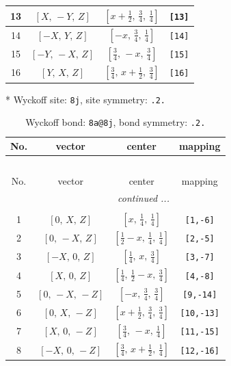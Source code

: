 \documentclass[fleqn,8pt]{jsarticle}
\begin{document}
\begin{longtable}{cccc}
13 & $\left[ X,\, - Y,\, Z \right]$ & $\left[ x + \frac{1}{2},\, \frac{3}{4},\, \frac{1}{4} \right]$ & {\tt [13]} \\ \hline
14 & $\left[ - X,\, Y,\, Z \right]$ & $\left[ - x,\, \frac{3}{4},\, \frac{1}{4} \right]$ & {\tt [14]} \\ \hline
15 & $\left[ - Y,\, - X,\, Z \right]$ & $\left[ \frac{3}{4},\, - x,\, \frac{3}{4} \right]$ & {\tt [15]} \\ \hline
16 & $\left[ Y,\, X,\, Z \right]$ & $\left[ \frac{3}{4},\, x + \frac{1}{2},\, \frac{3}{4} \right]$ & {\tt [16]} \\
\end{longtable}
* Wyckoff site: {\tt 8j}, site symmetry: {\tt .2.}
\renewcommand{\arraystretch}{1.2}
\begin{longtable}{cccc}
\caption{Wyckoff bond: {\tt 8a@8j}, bond symmetry: {\tt .2.}}
 \\
 \hline \hline
No. & vector & center & mapping \\ \hline \endfirsthead

\multicolumn{3}{l}{\tablename\ \thetable{}} \\
 \hline \hline
No. & vector & center & mapping \\ \hline \endhead

 \hline \hline
\multicolumn{3}{r}{\footnotesize\it continued ...} \\ \endfoot

 \hline \hline
\multicolumn{3}{r}{} \\ \endlastfoot

1 & $\left[ 0,\, X,\, Z \right]$ & $\left[ x,\, \frac{1}{4},\, \frac{1}{4} \right]$ & {\tt [1,-6]} \\ \hline
2 & $\left[ 0,\, - X,\, Z \right]$ & $\left[ \frac{1}{2} - x,\, \frac{1}{4},\, \frac{1}{4} \right]$ & {\tt [2,-5]} \\ \hline
3 & $\left[ - X,\, 0,\, Z \right]$ & $\left[ \frac{1}{4},\, x,\, \frac{3}{4} \right]$ & {\tt [3,-7]} \\ \hline
4 & $\left[ X,\, 0,\, Z \right]$ & $\left[ \frac{1}{4},\, \frac{1}{2} - x,\, \frac{3}{4} \right]$ & {\tt [4,-8]} \\ \hline
5 & $\left[ 0,\, - X,\, - Z \right]$ & $\left[ - x,\, \frac{3}{4},\, \frac{3}{4} \right]$ & {\tt [9,-14]} \\ \hline
6 & $\left[ 0,\, X,\, - Z \right]$ & $\left[ x + \frac{1}{2},\, \frac{3}{4},\, \frac{3}{4} \right]$ & {\tt [10,-13]} \\ \hline
7 & $\left[ X,\, 0,\, - Z \right]$ & $\left[ \frac{3}{4},\, - x,\, \frac{1}{4} \right]$ & {\tt [11,-15]} \\ \hline
8 & $\left[ - X,\, 0,\, - Z \right]$ & $\left[ \frac{3}{4},\, x + \frac{1}{2},\, \frac{1}{4} \right]$ & {\tt [12,-16]} \\
\end{longtable}
\end{document}
